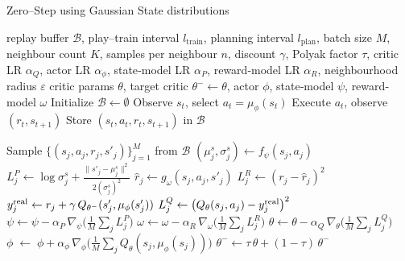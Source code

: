 \documentclass[11pt,a4paper]{report}
\begin{document}
\begin{algorithm}[ht]
\caption{Zero–Step using Gaussian State distributions}
\label{alg:zero_step_det_reward}
\begin{algorithmic}[1]
\Require 
  replay buffer $\mathcal B$, play–train interval $l_{\text{train}}$, planning interval $l_{\text{plan}}$, batch size $M$, neighbour count $K$, samples per neighbour $n$, discount $\gamma$, Polyak factor $\tau$,  
  critic LR $\alpha_Q$, actor LR $\alpha_\phi$,  
  state‐model LR $\alpha_P$, reward‐model LR $\alpha_R$, neighbourhood radius $\varepsilon$
\Ensure 
  critic params $\theta$, target critic $\theta^-\!\gets\theta$, actor $\phi$,  
  state‐model $\psi$, reward‐model $\omega$
\State Initialize $\mathcal B\!\gets\!\emptyset$
  \State Observe $s_t$, select $a_t=\mu_\phi(s_t)$
  \State Execute $a_t$, observe $(r_t,s_{t+1})$
  \State Store $(s_t,a_t,r_t,s_{t+1})$ in $\mathcal B$
  
   
    \State Sample $\{(s_j,a_j,r_j,s'_j)\}_{j=1}^M$ from $\mathcal B$
      \State $(\mu^s_j,\sigma^s_j)\gets f_\psi(s_j,a_j)$
      \State $L^P_j \gets \log\sigma^s_j + \frac{\|s'_j-\mu^s_j\|^2}{2(\sigma^s_j)^2}$
      \State $\hat r_j \gets g_\omega(s_j,a_j,s'_j)$
      \State $L^R_j \gets (r_j - \hat r_j)^2$
      \State $y^{\rm real}_j \gets r_j + \gamma\,Q_{\theta^-}(s'_j,\mu_\phi(s'_j))$
      \State $L^Q_j \gets \bigl(Q_\theta(s_j,a_j) - y^{\rm real}_j\bigr)^2$
    \EndFor
    \State $\psi \!\gets\! \psi - \alpha_P\,\nabla_\psi\bigl(\tfrac{1}{M}\sum_j L^P_j\bigr)$
    \State $\omega \!\gets\! \omega - \alpha_R\,\nabla_\omega\bigl(\tfrac{1}{M}\sum_j L^R_j\bigr)$
    \State $\theta \!\gets\! \theta - \alpha_Q\,\nabla_\theta\bigl(\tfrac{1}{M}\sum_j L^Q_j\bigr)$
    \State $\phi \;\gets\;\phi + \alpha_\phi\,\nabla_\phi\bigl(\tfrac{1}{M}\sum_j Q_\theta(s_j,\mu_\phi(s_j))\bigr)$
    \State $\theta^- \!\gets\! \tau\,\theta + (1-\tau)\,\theta^-$
  \EndIf
  

\end{algorithmic}
\end{algorithm}
\end{document}
